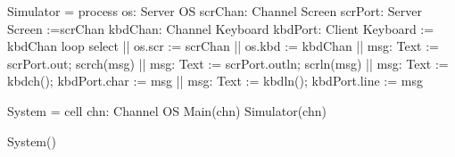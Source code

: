 \begin{code}
Simulator = process os: Server OS
{
    scrChan: Channel Screen
    scrPort: Server Screen :=scrChan
    kbdChan: Channel Keyboard
    kbdPort: Client Keyboard := kbdChan
    loop select
    {
        || os.scr := scrChan
        || os.kbd := kbdChan
        || msg: Text := scrPort.out; scrch(msg)
        || msg: Text := scrPort.outln; scrln(msg)
        || msg: Text := kbdch(); kbdPort.char := msg
        || msg: Text := kbdln(); kbdPort.line := msg
    }
}

System = cell
{
    chn: Channel OS
    Main(chn)
    Simulator(chn)
}

System()
\end{code}
